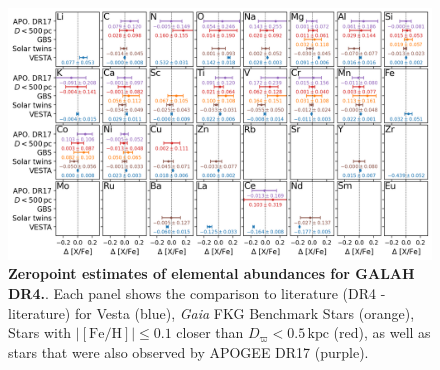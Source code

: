 \documentclass[
  journal=pasa,
  manuscript=research-paper, %
  year=2023,
  volume=37
]{cup-journal}
\newcommand{\Gaia}{\textit{Gaia}\xspace}
\begin{document}
\begin{figure}[ht]
 \centering
 \includegraphics[width=\textwidth]{figures/galah_dr4_zeropoint_checks_allstar.png}
 \caption{\textbf{Zeropoint estimates of elemental abundances for GALAH DR4.}. Each panel shows the comparison to literature (DR4 - literature) for Vesta (blue), \Gaia FKG Benchmark Stars (orange), Stars with $\vert \mathrm{[Fe/H]} \vert \leq 0.1$ closer than $D_\varpi < 0.5\,\mathrm{kpc}$ (red), as well as stars that were also observed by APOGEE DR17 (purple).}
 \label{fig:galah_dr4_zeropoint_checks_allstar}
\end{figure}
\end{document}
